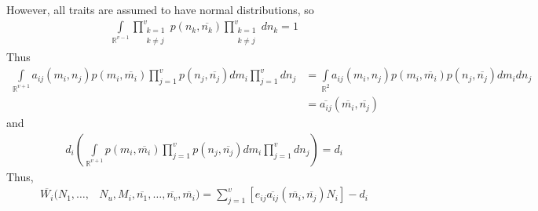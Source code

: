 \documentclass{amsart}
\theoremstyle{definition}
\theoremstyle{remark}
\numberwithin{equation}{section}
\begin{document}
However, all traits are assumed to have normal distributions, so
\begin{align*}
	\int\limits_{\mathbb{R}^{v-1}}\prod\limits_{\substack{k=1\\k\neq j}}^{v}p(n_k, \overline{n_k})\prod\limits_{\substack{k=1\\k\neq j}}^{v}dn_k = 1
\end{align*}
Thus
\begin{align*}
	\int\limits_{\mathbb{R}^{v+1}}^{}a_{ij}(m_i, n_j)p(m_i, \overline{m_i})\prod\limits_{j = 1}^{v}p(n_j, \overline{n_j})dm_i\prod\limits_{j = 1}^{v}dn_j &= \int\limits_{\mathbb{R}^2}a_{ij}(m_i, n_j)p(m_i, \overline{m_i})p(n_j, \overline{n_j})dm_idn_j \\
	&= \overline{a_{ij}}(\overline{m_i}, \overline{n_j})
\end{align*}
and
\begin{align*}
	d_i\left(\int\limits_{\mathbb{R}^{v+1}}p(m_i, \overline{m_i})\prod\limits_{j = 1}^{v}p(n_j, \overline{n_j})dm_i\prod\limits_{j = 1}^{v}dn_j\right) = d_i
\end{align*}
Thus,
\begin{align*}
	\overline{W_i}(N_1, \dots, &N_u, M_i, \overline{n_1}, \dots, \overline{n_v}, \overline{m_i}) = \sum\limits_{j = 1}^{v}\left[e_{ij}\overline{a_{ij}}(\overline{m_i}, \overline{n_j})N_i\right] - d_i
\end{align*}
\end{document}

